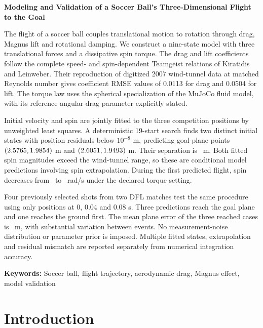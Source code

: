\documentclass[12pt,letterpaper]{article}
\begin{document}
\begin{center}
{\Large\bfseries Modeling and Validation of a Soccer Ball's Three-Dimensional Flight to the Goal\par}
\vspace{2mm}{\bfseries Problem B\par}
\vspace{3mm}{\bfseries Abstract\par}
\end{center}
The flight of a soccer ball couples translational motion to rotation through drag, Magnus lift and rotational damping. We construct a nine-state model with three translational forces and a dissipative spin torque. The drag and lift coefficients follow the complete speed- and spin-dependent Teamgeist relations of Kiratidis and Leinweber. Their reproduction of digitized 2007 wind-tunnel data at matched Reynolds number gives coefficient RMSE values of 0.0113 for drag and 0.0504 for lift. The torque law uses the spherical specialization of the MuJoCo fluid model, with its reference angular-drag parameter explicitly stated.

Initial velocity and spin are jointly fitted to the three competition positions by unweighted least squares. A deterministic 19-start search finds two distinct initial states with position residuals below $10^{-8}$ m, predicting goal-plane points $(2.5765,1.9854)$ m and $(2.6051,1.9493)$ m. Their separation is \GoalSeparation\ m. Both fitted spin magnitudes exceed the wind-tunnel range, so these are conditional model predictions involving spin extrapolation. During the first predicted flight, spin decreases from \StartSpin\ to \EndSpin\ rad/s under the declared torque setting.

Four previously selected shots from two DFL matches test the same procedure using only positions at 0, 0.04 and 0.08 s. Three predictions reach the goal plane and one reaches the ground first. The mean plane error of the three reached cases is \RealMeanError\ m, with substantial variation between events. No measurement-noise distribution or parameter prior is imposed. Multiple fitted states, extrapolation and residual mismatch are reported separately from numerical integration accuracy.

\noindent\textbf{Keywords:} Soccer ball, flight trajectory, aerodynamic drag, Magnus effect, model validation
\newpage
\tableofcontents
\newpage
\section{Introduction}
\end{document}
